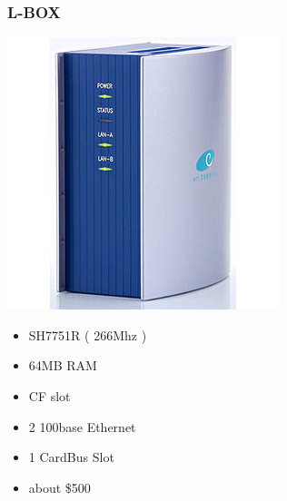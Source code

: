 \documentclass[cjk,dvipdfmx,12pt]{beamer}
\begin{document}
\begin{frame}
 \frametitle{L-BOX}
 \begin{minipage}[t]{0.4\hsize}
  \includegraphics[width=1.0\hsize]{image200705/lbox.jpg}
 \end{minipage} 
 \begin{minipage}[t]{0.5\hsize}
  \begin{itemize}
   \item SH7751R ( 266Mhz )
   \item 64MB RAM 
   \item CF slot 
   \item 2 100base Ethernet
   \item 1 CardBus Slot
   \item about \$500 
  \end{itemize}
 \end{minipage}
\end{frame}
\end{document}
